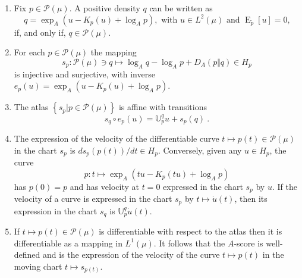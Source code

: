 \documentclass[graybox]{svmult}
\DeclareMathOperator{\Expectation}{E}
\begin{document}
\begin{proposition}

\begin{enumerate}
\item Fix $p\in \mathcal{P}(\mu )$. A positive density $q$ can be
written as 
\begin{equation*}
q=\exp _{A}(u-K_{p}(u)+\log _{A}p),\text{ with $u\in L^{2}(\mu )$ and ${\Expectation}_{\widetilde{p}}\left[ u\right] =0$,}
\end{equation*}
if, and only if, $q\in \mathcal{P}(\mu )$.

\item For each $p\in \mathcal{P}(\mu )$ the mapping 
\begin{equation*}
s_{p}\colon \mathcal{P}(\mu )\ni q\mapsto \log _{A}q-\log _{A}p+D_{A}(p\Vert
q)\in H_{p}
\end{equation*}
is injective and surjective, with inverse $e_{p}(u)=\exp
_{A}(u-K_{p}(u)+\log _{A}p)$.

\item The atlas $\left\{ s_{p}|p\in \mathcal{P}(\mu )\right\} $ is
affine with transitions 
\begin{equation*}
s_{q}\circ e_{p}(u)=\mathbb{U}_{p}^{q}u+s_{p}(q)\ .
\end{equation*}

\item The expression of the velocity of the differentiable curve $t\mapsto p(t)\in \mathcal{P}(\mu )$ in the chart $s_{p}$ is $ds_{p}(p(t))/dt\in H_{p}$. Conversely, given any $u\in H_{p}$, the curve 
\begin{equation*}
p\colon t\mapsto \exp _{A}(tu-K_{p}(tu)+\log _{A}p)
\end{equation*}
has $p(0)=p$ and has velocity at $t=0$ expressed in the chart $s_{p}$ by $u$. If the velocity of a curve is expressed in the chart $s_{p}$ by $t\mapsto 
\dot{u}(t)$, then its expression in the chart $s_{q}$ is $\mathbb{U}_{p}^{q}
\dot{u}(t)$.

\item If $t\mapsto p(t)\in \mathcal{P}(\mu )$ is differentiable with
respect to the atlas then it is differentiable as a mapping in $L^{1}(\mu )$. It follows that the $A$-score is well-defined and is the expression of the
velocity of the curve $t\mapsto p(t)$ in the moving chart $t\mapsto s_{p(t)}$.
\end{enumerate}
\end{proposition}
\end{document}
